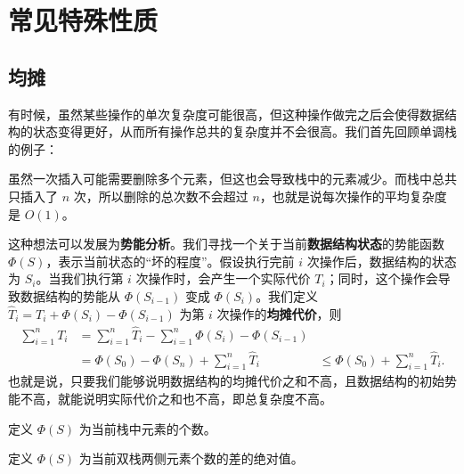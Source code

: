 \chapter{常见特殊性质}

\section{均摊}

有时候，虽然某些操作的单次复杂度可能很高，但这种操作做完之后会使得数据结构的状态变得更好，从而所有操作总共的复杂度并不会很高。我们首先回顾单调栈的例子：
\begin{example}[单调栈]
    虽然一次插入可能需要删除多个元素，但这也会导致栈中的元素减少。而栈中总共只插入了 $n$ 次，所以删除的总次数不会超过 $n$，也就是说每次操作的平均复杂度是 $O(1)$。
\end{example}

这种想法可以发展为\textbf{势能分析}。我们寻找一个关于当前\textbf{数据结构状态}的势能函数 $\Phi(S)$，表示当前状态的“坏的程度”。假设执行完前 $i$ 次操作后，数据结构的状态为 $S_i$。当我们执行第 $i$ 次操作时，会产生一个实际代价 $T_i$；同时，这个操作会导致数据结构的势能从 $\Phi(S_{i-1})$ 变成 $\Phi(S_i)$。我们定义 $\hat T_i = T_i + \Phi(S_i) - \Phi(S_{i-1})$ 为第 $i$ 次操作的\textbf{均摊代价}，则
$$
\begin{aligned}
\sum_{i=1}^n T_i &= \sum_{i=1}^n \hat T_i-\sum_{i=1}^n \Phi(S_i)-\Phi(S_{i-1})\\
&=\Phi(S_0)-\Phi(S_n)+\sum_{i=1}^n \hat T_i
&\le \Phi(S_0)+\sum_{i=1}^n \hat T_i.
\end{aligned}
$$
也就是说，只要我们能够说明数据结构的均摊代价之和不高，且数据结构的初始势能不高，就能说明实际代价之和也不高，即总复杂度不高。

\begin{exercise}[单调栈]
    定义 $\Phi(S)$ 为当前栈中元素的个数。
\end{exercise}

\begin{exercise}[双端队列]
    定义 $\Phi(S)$ 为当前双栈两侧元素个数的差的绝对值。
\end{exercise}

